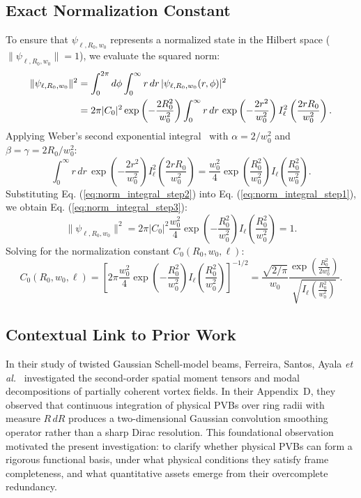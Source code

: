 \documentclass{optica-article}
\begin{document}
\subsection{Exact Normalization Constant}

To ensure that $\psi_{\ell, R_0, w_0}$ represents a normalized state in the Hilbert space ($\|\psi_{\ell, R_0, w_0}\| = 1$), we evaluate the squared norm:
\begin{align}
\|\psi_{\ell, R_0, w_0}\|^2 &= \int_0^{2\pi} d\phi \int_0^\infty r \, dr \, |\psi_{\ell, R_0, w_0}(r, \phi)|^2 \notag \\
&= 2\pi |C_0|^2 \exp\left( - \frac{2 R_0^2}{w_0^2} \right) \int_0^\infty r \, dr \, \exp\left( - \frac{2 r^2}{w_0^2} \right) I_\ell^2\left( \frac{2 r R_0}{w_0^2} \right).
\label{eq:norm_integral_step1}
\end{align}
Applying Weber's second exponential integral~\cite{Gradshteyn2014} with $\alpha = 2 / w_0^2$ and $\beta = \gamma = 2 R_0 / w_0^2$:
\begin{equation}
\int_0^\infty r \, dr \, \exp\left( - \frac{2 r^2}{w_0^2} \right) I_\ell^2\left( \frac{2 r R_0}{w_0^2} \right) = \frac{w_0^2}{4} \exp\left( \frac{R_0^2}{w_0^2} \right) I_\ell\left( \frac{R_0^2}{w_0^2} \right).
\label{eq:norm_integral_step2}
\end{equation}
Substituting Eq. (\ref{eq:norm_integral_step2}) into Eq. (\ref{eq:norm_integral_step1}), we obtain Eq. (\ref{eq:norm_integral_step3}):
\begin{equation}
\|\psi_{\ell, R_0, w_0}\|^2 = 2\pi |C_0|^2 \frac{w_0^2}{4} \exp\left( - \frac{R_0^2}{w_0^2} \right) I_\ell\left( \frac{R_0^2}{w_0^2} \right) = 1.
\label{eq:norm_integral_step3}
\end{equation}
Solving for the normalization constant $C_0(R_0, w_0, \ell)$:
\begin{equation}
\boxed{C_0(R_0, w_0, \ell) = \left[ 2\pi \frac{w_0^2}{4} \exp\left( - \frac{R_0^2}{w_0^2} \right) I_\ell\left( \frac{R_0^2}{w_0^2} \right) \right]^{-1/2} = \frac{\sqrt{2/\pi}}{w_0} \frac{\exp\left( \frac{R_0^2}{2 w_0^2} \right)}{\sqrt{I_\ell\left( \frac{R_0^2}{w_0^2} \right)}}.}
\label{eq:exact_normalization_constant}
\end{equation}

\subsection{Contextual Link to Prior Work}

In their study of twisted Gaussian Schell-model beams, Ferreira, Santos, Ayala \emph{et al.}~\cite{Ferreira2026} investigated the second-order spatial moment tensors and modal decompositions of partially coherent vortex fields. In their Appendix~D, they observed that continuous integration of physical PVBs over ring radii with measure $R \, dR$ produces a two-dimensional Gaussian convolution smoothing operator rather than a sharp Dirac resolution. This foundational observation motivated the present investigation: to clarify whether physical PVBs can form a rigorous functional basis, under what physical conditions they satisfy frame completeness, and what quantitative assets emerge from their overcomplete redundancy.
\end{document}
